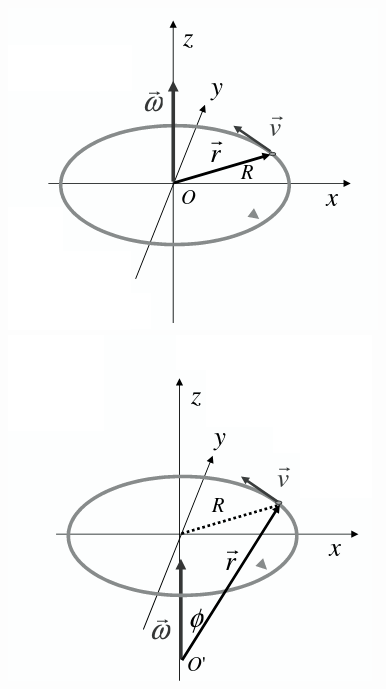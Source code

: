 \documentclass[a4paper,12pt, oneside]{book}
\begin{document}
\begin{center}
\includegraphics[scale=0.5]{img/cir5.png}
\quad
\includegraphics[scale=0.5]{img/cir6.png}
\end{center}
\end{document}
